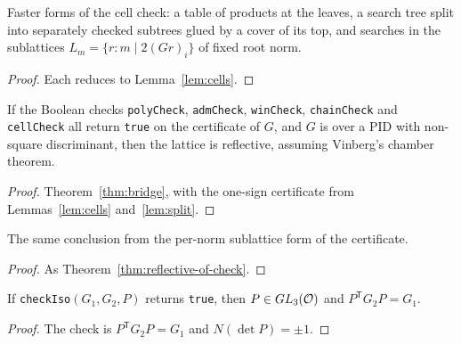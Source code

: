 \begin{lemma}\label{lem:split}
\leanok
{}
Faster forms of the cell check: a table of products at the leaves, a search tree split into
separately checked subtrees glued by a cover of its top, and searches in the sublattices
$L_m=\{r: m\mid 2(Gr)_i\}$ of fixed root norm.
\end{lemma}
\begin{proof}\leanok
Each reduces to Lemma~\ref{lem:cells}.
\end{proof}

\begin{theorem}\label{thm:reflective-of-check}
\leanok
{}
If the Boolean checks \texttt{polyCheck}, \texttt{admCheck}, \texttt{winCheck},
\texttt{chainCheck} and \texttt{cellCheck} all return \texttt{true} on the certificate of $G$,
and $G$ is over a PID with non-square discriminant, then the lattice is reflective, assuming
Vinberg's chamber theorem.
\end{theorem}
\begin{proof}\leanok
Theorem~\ref{thm:bridge}, with the one-sign certificate from Lemmas~\ref{lem:cells}
and~\ref{lem:split}.
\end{proof}

\begin{theorem}\label{thm:reflective-of-checkM}
\leanok
{}
The same conclusion from the per-norm sublattice form of the certificate.
\end{theorem}
\begin{proof}\leanok
As Theorem~\ref{thm:reflective-of-check}.
\end{proof}

\begin{theorem}\label{thm:iso}
\leanok
If \texttt{checkIso}$(G_1,G_2,P)$ returns \texttt{true}, then $P\in GL_3(\mathcal{O})$ and
$P^{\mathsf T}G_2P=G_1$.
\end{theorem}
\begin{proof}\leanok
The check is $P^{\mathsf T}G_2P=G_1$ and $N(\det P)=\pm1$.
\end{proof}

